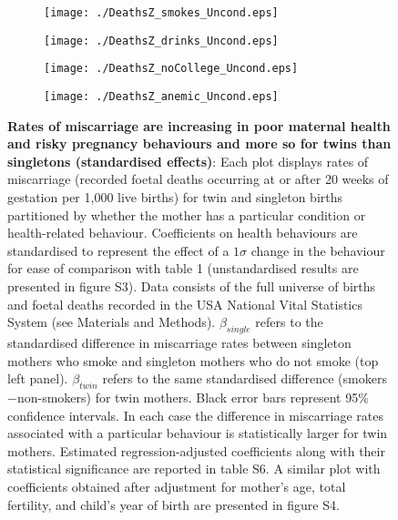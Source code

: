 \documentclass[11pt]{article}
\newcounter{lastnote}
\newenvironment{scilastnote}{%
   \setcounter{lastnote}{\value{enumiv}}%
   \addtocounter{lastnote}{+1}%
   \begin{list}%
     {\arabic{lastnote}.}
     {\setlength{\leftmargin}{.22in}}
     {\setlength{\labelsep}{.5em}}}
                {\end{list}}
\begin{document}
\begin{spacing}{1}

\begin{figure}[htpb!]
\begin{subfigure}{.5\textwidth}
  \texttt{[image: ./DeathsZ\_smokes\_Uncond.eps]}
\end{subfigure}%
\begin{subfigure}{.5\textwidth}
  \texttt{[image: ./DeathsZ\_drinks\_Uncond.eps]}
\end{subfigure}
\begin{subfigure}{.5\textwidth}
  \texttt{[image: ./DeathsZ\_noCollege\_Uncond.eps]}
\end{subfigure}%
\begin{subfigure}{.5\textwidth}
  \texttt{[image: ./DeathsZ\_anemic\_Uncond.eps]}
\end{subfigure}
\vspace{5mm}
\caption{\textbf{Rates of miscarriage are increasing in poor maternal health and risky pregnancy behaviours and more so for twins than singletons (standardised effects)}: {\footnotesize Each plot displays rates of miscarriage (recorded foetal deaths occurring at or after 20 weeks of gestation per 1,000 live births) for twin and singleton births partitioned by whether the mother has a particular condition or health-related behaviour. Coefficients on health behaviours are standardised to represent the effect of a $1\sigma$ change in the behaviour for ease of comparison with table 1 (unstandardised results are presented in figure S3). Data consists of the full universe of births and foetal deaths recorded in the USA National Vital Statistics System  (see Materials and Methods). $\beta_{single}$ refers to the standardised difference in miscarriage rates between singleton mothers who smoke and singleton mothers who do not smoke (top left panel). $\beta_{twin}$ refers to the same standardised difference (smokers$-$non-smokers) for twin mothers.  Black error bars represent 95\% confidence intervals. In each case the difference in miscarriage rates associated with a particular behaviour is statistically larger for twin mothers.  Estimated regression-adjusted coefficients along with their statistical significance are reported in table S6. A similar plot with coefficients obtained after adjustment for mother's age, total fertility, and child's year of birth are presented in figure S4.}}
\label{fig:mech}
\end{figure}
\end{spacing}

\end{document}
